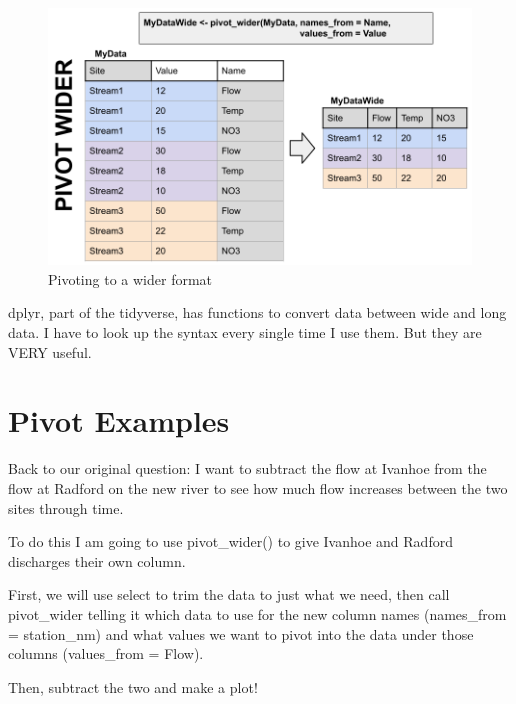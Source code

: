 \documentclass[
]{book}
\begin{document}
\begin{figure}
\centering
\includegraphics{images/pivot_wider.png}
\caption{Pivoting to a wider format}
\end{figure}

dplyr, part of the tidyverse, has functions to convert data between wide and long data. I have to look up the syntax every single time I use them. But they are VERY useful.

\hypertarget{pivot-examples}{%
\section{Pivot Examples}\label{pivot-examples}}

Back to our original question: I want to subtract the flow at Ivanhoe from the flow at Radford on the new river to see how much flow increases between the two sites through time.

To do this I am going to use pivot\_wider() to give Ivanhoe and Radford discharges their own column.

First, we will use select to trim the data to just what we need, then call pivot\_wider telling it which data to use for the new column names (names\_from = station\_nm) and what values we want to pivot into the data under those columns (values\_from = Flow).

Then, subtract the two and make a plot!
\end{document}
